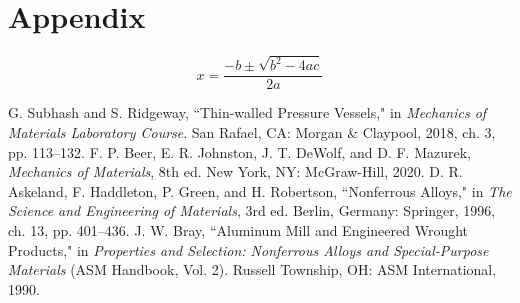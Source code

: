 \documentclass[10pt,journal,letterpaper]{IEEEtran}
\begin{document}
\lipsum[21]

\section*{Appendix}

\lipsum[22-24]
\begin{equation}
x=\frac{-b\pm\sqrt{b^2-4ac}}{2a}
\end{equation}
\lipsum[25]


\begin{thebibliography}{00}
 G. Subhash and S. Ridgeway, ``Thin-walled Pressure Vessels," in \textit{Mechanics of Materials Laboratory Course}. San Rafael, CA: Morgan \& Claypool, 2018, ch. 3, pp. 113--132.
 F. P. Beer, E. R. Johnston, J. T. DeWolf, and D. F. Mazurek, \textit{Mechanics of Materials}, 8th ed. New York, NY: McGraw-Hill, 2020.
 D. R. Askeland, F. Haddleton, P. Green, and H. Robertson, ``Nonferrous Alloys," in \textit{The Science and Engineering of Materials}, 3rd ed. Berlin, Germany: Springer, 1996, ch. 13, pp. 401--436.
 J. W. Bray, ``Aluminum Mill and Engineered Wrought Products," in \textit{Properties and Selection: Nonferrous Alloys and Special-Purpose Materials} (ASM Handbook, Vol. 2). Russell Township, OH: ASM International, 1990.
\end{thebibliography}
\end{document}
